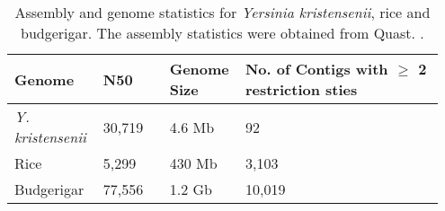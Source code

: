 \begin{table*}
\centering
\begin{tabular}{| p{0.20\linewidth} |  
			  p{0.15\linewidth} | 
			  p{0.15\linewidth} | 
			  p{0.45\linewidth} |}
\hline
Genome                     		 			 	& N50   	& Genome Size 		& No. of Contigs with  $\geq$ 2 restriction sties\\

\hline
{\em Y. kristensenii}     	 		         & 30,719 	& 4.6 Mb 				& 92 \\
Rice                       		 		         	& 5,299  	& 430 Mb 				& 3,103 \\
Budgerigar                     	         			         	& 77,556 	& 1.2 Gb 				& 10,019 \\
\hline
\end{tabular}
\caption{Assembly and genome statistics for \emph{Yersinia kristensenii}, rice and budgerigar.  The assembly statistics were obtained from Quast. \cite{QUAST}.}
\label{tab:assembly_stats}
\end{table*}